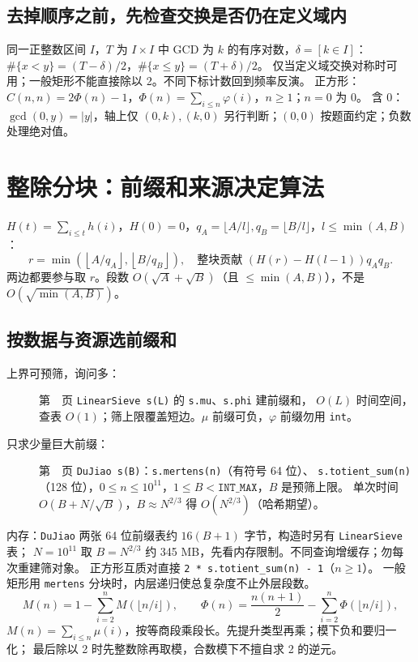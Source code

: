 \subsection{去掉顺序之前，先检查交换是否仍在定义域内}
同一正整数区间 $I$，$T$ 为 $I\times I$ 中 GCD 为 $k$ 的有序对数，$\delta=[k\in I]$：
$\#\{x<y\}=(T-\delta)/2$，$\#\{x\le y\}=(T+\delta)/2$。
仅当定义域交换对称时可用；一般矩形不能直接除以 2。不同下标计数回到频率反演。
正方形：$C(n,n)=2\Phi(n)-1$，$\Phi(n)=\sum_{i\le n}\varphi(i)$，$n\ge1$；$n=0$ 为 0。
含 0：$\gcd(0,y)=|y|$，轴上仅 $(0,k),(k,0)$ 另行判断；$(0,0)$ 按题面约定；负数处理绝对值。

\section{整除分块：前缀和来源决定算法}\label{knowledge-quotient-choice}
$H(t)=\sum_{i\le t}h(i)$，$H(0)=0$，$q_A=\lfloor A/l\rfloor,q_B=\lfloor B/l\rfloor$，$l\le\min(A,B)$：
\[
r=\min\!\left(\left\lfloor A/q_A\right\rfloor,
                 \left\lfloor B/q_B\right\rfloor\right),
\quad\text{整块贡献 }(H(r)-H(l-1))q_Aq_B.
\]
两边都要参与取 $r$。段数 $O(\sqrt A+\sqrt B)$（且 $\le\min(A,B)$），不是 $O(\sqrt{\min(A,B)})$。

\subsection{按数据与资源选前缀和}
\begin{description}
\item[上界可预筛，询问多：]
第~\pageref{compact-LinearSieve}~页 \texttt{LinearSieve s(L)} 的 \texttt{s.mu}、\texttt{s.phi} 建前缀和，
$O(L)$ 时间空间，查表 $O(1)$；筛上限覆盖短边。$\mu$ 前缀可负，$\varphi$ 前缀勿用 \texttt{int}。
\item[只求少量巨大前缀：]
第~\pageref{compact-DuJiao}~页 \texttt{DuJiao s(B)}：\texttt{s.mertens(n)}（有符号 64 位）、
\texttt{s.totient\_sum(n)}（128 位），$0\le n\le10^{11}$，$1\le B<\texttt{INT\_MAX}$，$B$ 是预筛上限。
单次时间 $O(B+N/\sqrt B)$，$B\approx N^{2/3}$ 得 $O(N^{2/3})$（哈希期望）。
\end{description}
内存：\texttt{DuJiao} 两张 64 位前缀表约 $16(B+1)$ 字节，构造时另有 \texttt{LinearSieve} 表；
$N=10^{11}$ 取 $B=N^{2/3}$ 约 345 MB，先看内存限制。不同查询增缓存；勿每次重建筛对象。
正方形互质对直接 \texttt{2 * s.totient\_sum(n) - 1}（$n\ge1$）。
一般矩形用 \texttt{mertens} 分块时，内层递归使总复杂度不止外层段数。
\[
M(n)=1-\sum_{i=2}^{n}M(\lfloor n/i\rfloor),\qquad
\Phi(n)=\frac{n(n+1)}2-\sum_{i=2}^{n}\Phi(\lfloor n/i\rfloor),
\]
$M(n)=\sum_{i\le n}\mu(i)$，按等商段乘段长。先提升类型再乘；模下负和要归一化；
最后除以 2 时先整数除再取模，合数模下不擅自求 2 的逆元。
